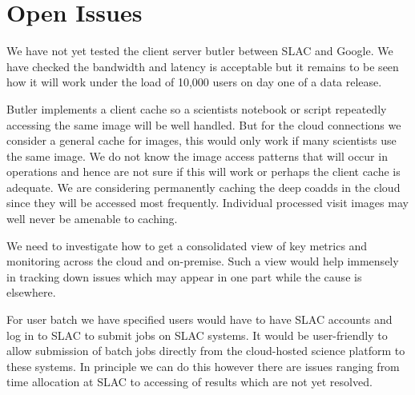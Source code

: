 \section{Open Issues} \label{sec:open}

We have not yet tested the client server butler between SLAC and Google.
We have checked the bandwidth and latency is acceptable but it remains to be seen how it will work under the load of 10,000 users on day one of a data release.

Butler implements a client cache  so a scientists notebook or script  repeatedly accessing the same image will be well handled.
But for the cloud connections we consider a general cache for images,  this would only work if many scientists use the same image.
We do not know the image access patterns that will occur in operations and hence are not sure if this will work or perhaps the client cache is adequate.
We are considering permanently caching the deep coadds in the cloud since they will be accessed most frequently.
Individual processed visit images may well never be amenable to caching.

We need to investigate how to get a  consolidated view of key metrics and monitoring across the cloud and on-premise.
Such a view would help immensely in tracking down issues which may appear in one part while the cause is elsewhere.

For user batch we have specified users would have to have SLAC accounts and log in to SLAC to submit jobs \cite{DMTN-223} on SLAC systems.
It would be user-friendly to allow submission of batch jobs directly from the cloud-hosted science platform to these systems.
In principle we can do this however there are issues ranging from time allocation at SLAC to accessing of results which are not yet resolved.
